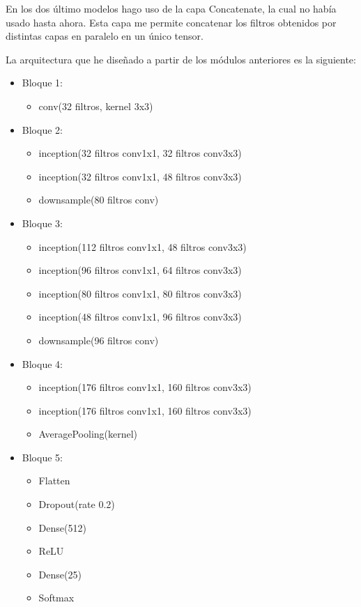 \documentclass[10pt,a4paper]{article}
\begin{document}
En los dos último modelos hago uso de la capa Concatenate, la cual no había usado hasta ahora. Esta capa me permite concatenar los filtros obtenidos por distintas capas en paralelo en un único tensor.

La arquitectura que he diseñado a partir de los módulos anteriores es la siguiente:
\begin{itemize}
\item Bloque 1:
	\begin{itemize}
	\item conv(32 filtros, kernel 3x3)
	\end{itemize}
\item Bloque 2:
	\begin{itemize}
	\item inception(32 filtros conv1x1, 32 filtros conv3x3)
	\item inception(32 filtros conv1x1, 48 filtros conv3x3)
	\item downsample(80 filtros conv)
	\end{itemize}
\item Bloque 3:
	\begin{itemize}
	\item inception(112 filtros conv1x1, 48 filtros conv3x3)
	\item inception(96 filtros conv1x1, 64 filtros conv3x3)
	\item inception(80 filtros conv1x1, 80 filtros conv3x3)
	\item inception(48 filtros conv1x1, 96 filtros conv3x3)
	\item downsample(96 filtros conv)
	\end{itemize}
\item Bloque 4:
	\begin{itemize}
	\item inception(176 filtros conv1x1, 160 filtros conv3x3)
	\item inception(176 filtros conv1x1, 160 filtros conv3x3)
	\item AveragePooling(kernel)
	\end{itemize}
\item Bloque 5:
	\begin{itemize}
	\item Flatten
	\item Dropout(rate 0.2)
	\item Dense(512)
	\item ReLU
	\item Dense(25)
	\item Softmax
	\end{itemize}
\end{itemize}
\end{document}
